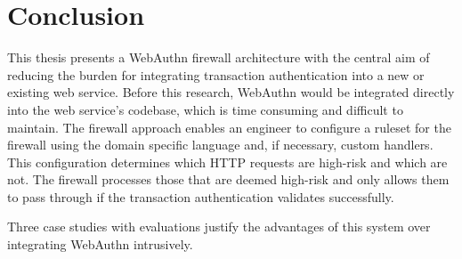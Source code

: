
\chapter{Conclusion}\label{Chap:Conclusion}

This thesis presents a WebAuthn firewall architecture with the central aim of reducing the burden for integrating transaction authentication into a new or existing web service. Before this research, WebAuthn would be integrated directly into the web service's codebase, which is time consuming and difficult to maintain. The firewall approach enables an engineer to configure a ruleset for the firewall using the domain specific language and, if necessary, custom handlers. This configuration determines which HTTP requests are high-risk and which are not. The firewall processes those that are deemed high-risk and only allows them to pass through if the transaction authentication validates successfully.

Three case studies with evaluations justify the advantages of this system over integrating WebAuthn intrusively.

